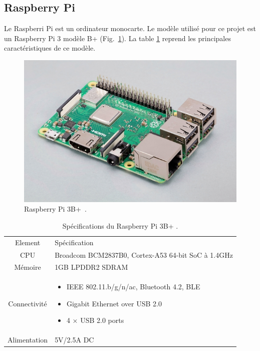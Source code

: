 \subsection*{Raspberry Pi}

Le Raspberri Pi est un ordinateur monocarte. Le modèle utilisé pour ce projet est un Raspberry Pi 3 modèle B+ (Fig.~\ref{fig:state-raspberrypi}). La table \ref{tb:state-raspberrypi-spec} reprend les principales caractéristiques de ce modèle.

\begin{figure}[H]
    \centering
    \includegraphics[scale=0.4]{res/raspberrypi3b+.png}
    \caption{Raspberry Pi 3B+~\cite{raspberry:shop}.}
    \label{fig:state-raspberrypi}
\end{figure}

\begin{table}[H]
    \centering
    \begin{tabular}{|c|p{}|}
        \hline
        \rowcolor{lightgray}
        Element            & Spécification\\
        CPU & Broadcom BCM2837B0, Cortex-A53 64-bit SoC à 1.4GHz\\ \hline
        Mémoire & 1GB LPDDR2 SDRAM \\ \hline
        Connectivité & 
        \begin{itemize}
            \item IEEE 802.11.b/g/n/ac, Bluetooth 4.2, BLE
            \item Gigabit Ethernet over USB 2.0
            \item 4 × USB 2.0 ports
        \end{itemize}\\ \hline
        Alimentation & 5V/2.5A DC\\ \hline
    \end{tabular}
    \caption{Spécifications du Raspberry Pi 3B+ \cite{raspberry:shop}.}
    \label{tb:state-raspberrypi-spec}
\end{table}
